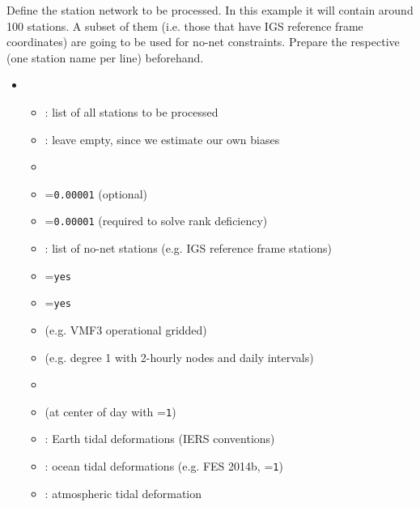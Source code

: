 Define the station network to be processed. In this example it will contain around 100 stations. A subset of them
(i.e. those that have IGS reference frame coordinates) are going to be used for no-net constraints. Prepare the
respective  (one station name per line) beforehand.
\begin{itemize}
  \item {}
  \begin{itemize}
    \item {}: list of all stations to be processed
    \item {}: leave empty, since we estimate our own biases
    \item {}
    \item {}=\verb|0.00001| (optional)
    \item {}=\verb|0.00001| (required to solve rank deficiency)
    \item {}: list of no-net stations (e.g. IGS reference frame stations)
    \item {}=\verb|yes|
    \item {}=\verb|yes|
    \item {} (e.g. VMF3 operational gridded)
    \item {} (e.g. degree 1 with 2-hourly
          nodes and daily intervals)
    \item {}
    \item {} (at center of day with
          =\verb|1|)
    \item {}: Earth tidal deformations (IERS conventions)
    \item {}: ocean tidal deformations
          (e.g. FES 2014b, =\verb|1|)
    \item {}: atmospheric tidal deformation

\end{itemize}
\end{itemize}
